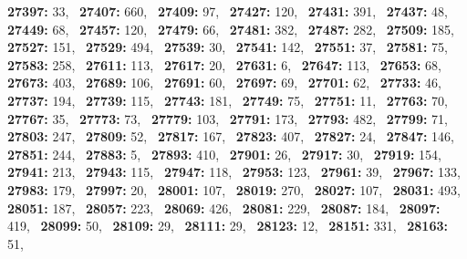 \textbf{27397:} 33,\allowbreak~ 
\textbf{27407:} 660,\allowbreak~ 
\textbf{27409:} 97,\allowbreak~ 
\textbf{27427:} 120,\allowbreak~ 
\textbf{27431:} 391,\allowbreak~ 
\textbf{27437:} 48,\allowbreak~ 
\textbf{27449:} 68,\allowbreak~ 
\textbf{27457:} 120,\allowbreak~ 
\textbf{27479:} 66,\allowbreak~ 
\textbf{27481:} 382,\allowbreak~ 
\textbf{27487:} 282,\allowbreak~ 
\textbf{27509:} 185,\allowbreak~ 
\textbf{27527:} 151,\allowbreak~ 
\textbf{27529:} 494,\allowbreak~ 
\textbf{27539:} 30,\allowbreak~ 
\textbf{27541:} 142,\allowbreak~ 
\textbf{27551:} 37,\allowbreak~ 
\textbf{27581:} 75,\allowbreak~ 
\textbf{27583:} 258,\allowbreak~ 
\textbf{27611:} 113,\allowbreak~ 
\textbf{27617:} 20,\allowbreak~ 
\textbf{27631:} 6,\allowbreak~ 
\textbf{27647:} 113,\allowbreak~ 
\textbf{27653:} 68,\allowbreak~ 
\textbf{27673:} 403,\allowbreak~ 
\textbf{27689:} 106,\allowbreak~ 
\textbf{27691:} 60,\allowbreak~ 
\textbf{27697:} 69,\allowbreak~ 
\textbf{27701:} 62,\allowbreak~ 
\textbf{27733:} 46,\allowbreak~ 
\textbf{27737:} 194,\allowbreak~ 
\textbf{27739:} 115,\allowbreak~ 
\textbf{27743:} 181,\allowbreak~ 
\textbf{27749:} 75,\allowbreak~ 
\textbf{27751:} 11,\allowbreak~ 
\textbf{27763:} 70,\allowbreak~ 
\textbf{27767:} 35,\allowbreak~ 
\textbf{27773:} 73,\allowbreak~ 
\textbf{27779:} 103,\allowbreak~ 
\textbf{27791:} 173,\allowbreak~ 
\textbf{27793:} 482,\allowbreak~ 
\textbf{27799:} 71,\allowbreak~ 
\textbf{27803:} 247,\allowbreak~ 
\textbf{27809:} 52,\allowbreak~ 
\textbf{27817:} 167,\allowbreak~ 
\textbf{27823:} 407,\allowbreak~ 
\textbf{27827:} 24,\allowbreak~ 
\textbf{27847:} 146,\allowbreak~ 
\textbf{27851:} 244,\allowbreak~ 
\textbf{27883:} 5,\allowbreak~ 
\textbf{27893:} 410,\allowbreak~ 
\textbf{27901:} 26,\allowbreak~ 
\textbf{27917:} 30,\allowbreak~ 
\textbf{27919:} 154,\allowbreak~ 
\textbf{27941:} 213,\allowbreak~ 
\textbf{27943:} 115,\allowbreak~ 
\textbf{27947:} 118,\allowbreak~ 
\textbf{27953:} 123,\allowbreak~ 
\textbf{27961:} 39,\allowbreak~ 
\textbf{27967:} 133,\allowbreak~ 
\textbf{27983:} 179,\allowbreak~ 
\textbf{27997:} 20,\allowbreak~ 
\textbf{28001:} 107,\allowbreak~ 
\textbf{28019:} 270,\allowbreak~ 
\textbf{28027:} 107,\allowbreak~ 
\textbf{28031:} 493,\allowbreak~ 
\textbf{28051:} 187,\allowbreak~ 
\textbf{28057:} 223,\allowbreak~ 
\textbf{28069:} 426,\allowbreak~ 
\textbf{28081:} 229,\allowbreak~ 
\textbf{28087:} 184,\allowbreak~ 
\textbf{28097:} 419,\allowbreak~ 
\textbf{28099:} 50,\allowbreak~ 
\textbf{28109:} 29,\allowbreak~ 
\textbf{28111:} 29,\allowbreak~ 
\textbf{28123:} 12,\allowbreak~ 
\textbf{28151:} 331,\allowbreak~ 
\textbf{28163:} 51,\allowbreak~ 
